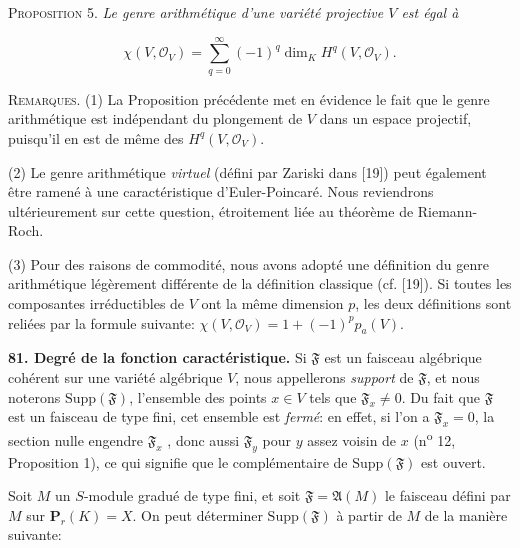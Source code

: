 \textsc{Proposition} 5. \textit{Le genre arithmétique d'une variété projective $V$ est égal à}

\begin{equation*}
\chi(V, \mathcal{O}_V) = \sum_{q=0}^{\infty} (-1)^q \dim_K H^q(V, \mathcal{O}_V).
\end{equation*}

\textsc{Remarques}. (1) La Proposition précédente met en évidence le fait que le genre arithmétique est indépendant du plongement de $V$ dans un espace projectif, puisqu'il en est de même des $H^q(V, \mathcal{O}_V)$.

(2) Le genre arithmétique \textit{virtuel} (défini par Zariski dans [19]) peut également être ramené à une caractéristique d'Euler-Poincaré. Nous reviendrons ultérieurement sur cette question, étroitement liée au théorème de Riemann-Roch.

(3) Pour des raisons de commodité, nous avons adopté une définition du genre arithmétique légèrement différente de la définition classique (cf. [19]). Si toutes les composantes irréductibles de $V$ ont la même dimension $p$, les deux définitions sont reliées par la formule suivante: $\chi(V, \mathcal{O}_V) = 1 + (-1)^p p_a(V)$.

\textbf{81. Degré de la fonction caractéristique.} Si $\mathfrak{F}$ est un faisceau algébrique cohérent sur une variété algébrique $V$, nous appellerons \textit{support} de $\mathfrak{F}$, et nous noterons $\mathrm{Supp}(\mathfrak{F})$, l'ensemble des points $x \in V$ tels que $\mathfrak{F}_x \neq 0$. Du fait que $\mathfrak{F}$ est un faisceau de type fini, cet ensemble est \textit{fermé}: en effet, si l'on a $\mathfrak{F}_x = 0$, la section nulle engendre $\mathfrak{F}_x$ , donc aussi $\mathfrak{F}_y$ pour $y$ assez voisin de $x$ (n\textsuperscript{o} 12, Proposition 1), ce qui signifie que le complémentaire de $\mathrm{Supp}(\mathfrak{F})$ est ouvert.

Soit $M$ un $S$-module gradué de type fini, et soit $\mathfrak{F} = \mathfrak{A}(M)$ le faisceau défini par $M$ sur $\mathbf{P}_r(K) = X$. On peut déterminer $\mathrm{Supp}(\mathfrak{F})$ à partir de $M$ de la manière suivante:

